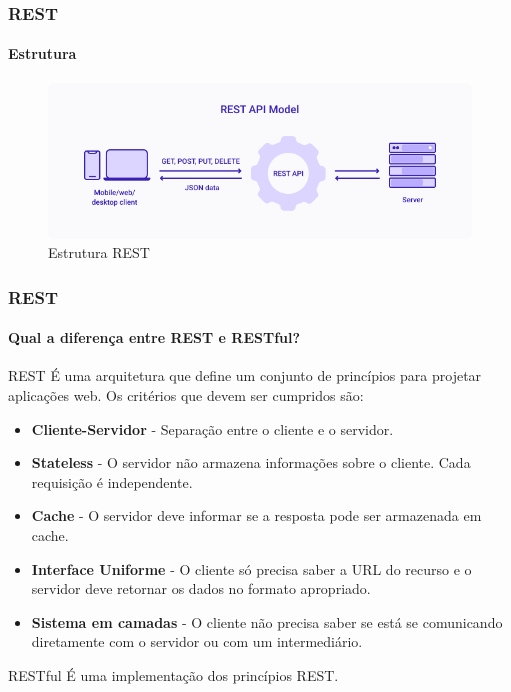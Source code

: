 \documentclass[
	9pt, %
	t, %
]{beamer}
\begin{document}
\begin{frame}
	\frametitle{REST}
	\framesubtitle{Estrutura}

	\begin{figure}
		\includegraphics[width=0.9\linewidth]{rest_estrutura.png}
		\caption{Estrutura REST}
		\label{fig:rest_structure}
	\end{figure}

\end{frame}

\begin{frame}
	\frametitle{REST}
	\framesubtitle{Qual a diferença entre REST e RESTful?}

	\begin{block}{REST}
		É uma \alert{arquitetura} que define um conjunto de princípios para projetar aplicações web.
		Os critérios que devem ser cumpridos são:
		\begin{itemize}
			\item \textbf{Cliente-Servidor} - Separação entre o cliente e o servidor.
			\item \textbf{Stateless} - O servidor não armazena informações sobre o cliente. Cada requisição é independente.
			\item \textbf{Cache} - O servidor deve informar se a resposta pode ser armazenada em cache.
			\item \textbf{Interface Uniforme} - O cliente só precisa saber a URL do recurso e o servidor deve retornar os dados no formato apropriado.
			\item \textbf{Sistema em camadas} - O cliente não precisa saber se está se comunicando diretamente com o servidor ou com um intermediário.
		\end{itemize}
	
	\end{block}

	\begin{block}{RESTful}
		É uma \alert{implementação} dos princípios REST.
	\end{block}
	
\end{frame}
\end{document}
